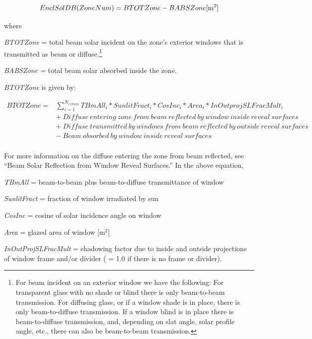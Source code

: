 \begin{equation}
EnclSolDB(ZoneNum) = BTOTZone - BABSZone{\rm{    [}}{{\rm{m}}^{\rm{2}}}]
\end{equation}

where

\emph{BTOTZone} = total beam solar incident on the zone's exterior windows that is transmitted as beam or diffuse.\footnote{For beam incident on an exterior window we have the following: For transparent glass with no shade or blind there is only beam-to-beam transmission. For diffusing glass, or if a window shade is in place, there is only beam-to-diffuse transmission. If a window blind is in place there is beam-to-diffuse transmission, and, depending on slat angle, solar profile angle, etc., there can also be beam-to-beam transmission.}

\emph{BABSZone =} total beam solar absorbed inside the zone.

\emph{BTOTZone} is given by:

\begin{equation}
\begin{array}{rl}
BTOTZone = & \sum\limits_{i = 1}^{{N_{extwin}}} {TBmAl{l_i}*SunlitFrac{t_i}*CosIn{c_i}*Are{a_i}*InOutprojSLFracMul{t_i}} \\
           & +~Diffuse~entering~zone~from~beam~reflected~by~window~inside~reveal~surfaces \\
           & +~Diffuse~transmitted~by~windows~from~beam~reflected~by~outside~reveal~surfaces \\
           & -~Beam~absorbed~by~window~inside~reveal~surfaces \\
\end{array}
\end{equation}

For more information on the diffuse entering the zone from beam reflected, see ``Beam Solar Reflection from Window Reveal Surfaces.''  In the above equation,

\emph{TBmAll} = beam-to-beam plus beam-to-diffuse transmittance of window

\emph{SunlitFract} = fraction of window irradiated by sun

\emph{CosInc} = cosine of solar incidence angle on window

\emph{Area} = glazed area of window {[}m\(^{2}\){]}

\emph{InOutProjSLFracMult} = shadowing factor due to inside and outside projections of window frame and/or divider ( = 1.0 if there is no frame or divider).

